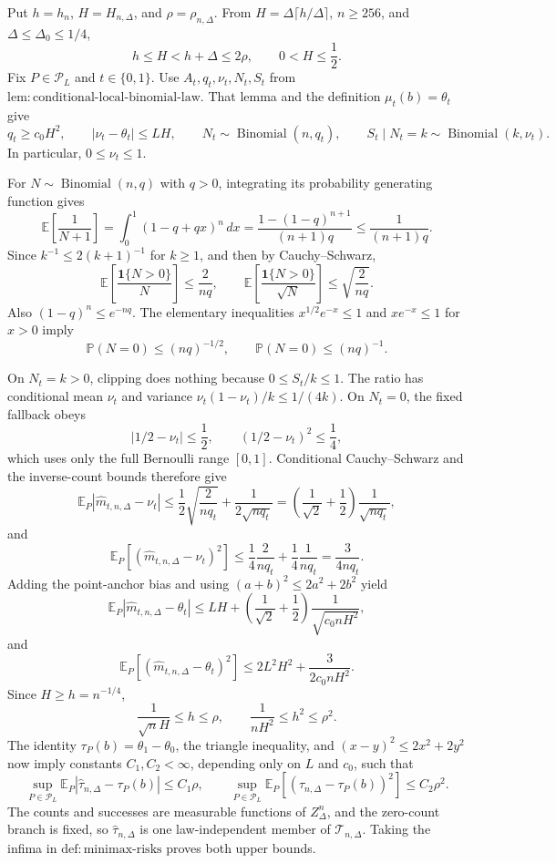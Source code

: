 Put \(h=h_n\), \(H=H_{n,\Delta}\), and \(\rho=\rho_{n,\Delta}\).  From \(H=\Delta\lceil h/\Delta\rceil\), \(n\geq256\), and \(\Delta\leq\Delta_0\leq1/4\),
\[
 h\leq H<h+\Delta\leq2\rho,
 \qquad 0<H\leq\frac12.
\]
Fix \(P\in\mathcal P_L\) and \(t\in\{0,1\}\).  Use \(A_t,q_t,\nu_t,N_t,S_t\) from \(\mathrm{lem:conditional\text{-}local\text{-}binomial\text{-}law}\).  That lemma and the definition \(\mu_t(b)=\theta_t\) give
\[
 q_t\geq c_0H^2,
 \qquad |\nu_t-\theta_t|\leq LH,
 \qquad N_t\sim\operatorname{Binomial}(n,q_t),
 \qquad S_t\mid N_t=k\sim\operatorname{Binomial}(k,\nu_t).
\]
In particular, \(0\leq\nu_t\leq1\).

For \(N\sim\operatorname{Binomial}(n,q)\) with \(q>0\), integrating its probability generating function gives
\[
 \mathbb E\!\left[\frac1{N+1}\right]
 =\int_0^1(1-q+qx)^n\,dx
 =\frac{1-(1-q)^{n+1}}{(n+1)q}
 \leq\frac1{(n+1)q}.
\]
Since \(k^{-1}\leq2(k+1)^{-1}\) for \(k\geq1\), and then by Cauchy--Schwarz,
\[
 \mathbb E\!\left[\frac{\mathbf1\{N>0\}}N\right]\leq\frac2{nq},
 \qquad
 \mathbb E\!\left[\frac{\mathbf1\{N>0\}}{\sqrt N}\right]
 \leq\sqrt{\frac2{nq}}.
\]
Also \((1-q)^n\leq e^{-nq}\).  The elementary inequalities \(x^{1/2}e^{-x}\leq1\) and \(xe^{-x}\leq1\) for \(x>0\) imply
\[
 \mathbb P(N=0)\leq(nq)^{-1/2},
 \qquad
 \mathbb P(N=0)\leq(nq)^{-1}.
\]

On \(N_t=k>0\), clipping does nothing because \(0\leq S_t/k\leq1\).  The ratio has conditional mean \(\nu_t\) and variance \(\nu_t(1-\nu_t)/k\leq1/(4k)\).  On \(N_t=0\), the fixed fallback obeys
\[
 |1/2-\nu_t|\leq\frac12,
 \qquad (1/2-\nu_t)^2\leq\frac14,
\]
which uses only the full Bernoulli range \([0,1]\).  Conditional Cauchy--Schwarz and the inverse-count bounds therefore give
\[
 \mathbb E_P|\widehat m_{t,n,\Delta}-\nu_t|
 \leq\frac12\sqrt{\frac2{nq_t}}
      +\frac1{2\sqrt{nq_t}}
 =\left(\frac1{\sqrt2}+\frac12\right)\frac1{\sqrt{nq_t}},
\]
and
\[
 \mathbb E_P[(\widehat m_{t,n,\Delta}-\nu_t)^2]
 \leq\frac14\frac2{nq_t}+\frac14\frac1{nq_t}
 =\frac3{4nq_t}.
\]
Adding the point-anchor bias and using \((a+b)^2\leq2a^2+2b^2\) yield
\[
 \mathbb E_P|\widehat m_{t,n,\Delta}-\theta_t|
 \leq LH+\left(\frac1{\sqrt2}+\frac12\right)
              \frac1{\sqrt{c_0nH^2}},
\]
and
\[
 \mathbb E_P[(\widehat m_{t,n,\Delta}-\theta_t)^2]
 \leq2L^2H^2+\frac3{2c_0nH^2}.
\]
Since \(H\geq h=n^{-1/4}\),
\[
 \frac1{\sqrt nH}\leq h\leq\rho,
 \qquad
 \frac1{nH^2}\leq h^2\leq\rho^2.
\]
The identity \(\tau_P(b)=\theta_1-\theta_0\), the triangle inequality, and \((x-y)^2\leq2x^2+2y^2\) now imply constants \(C_1,C_2<\infty\), depending only on \(L\) and \(c_0\), such that
\[
 \sup_{P\in\mathcal P_L}
 \mathbb E_P|\widehat\tau_{n,\Delta}-\tau_P(b)|\leq C_1\rho,
 \qquad
 \sup_{P\in\mathcal P_L}
 \mathbb E_P[(\widehat\tau_{n,\Delta}-\tau_P(b))^2]\leq C_2\rho^2.
\]
The counts and successes are measurable functions of \(Z_\Delta^n\), and the zero-count branch is fixed, so \(\widehat\tau_{n,\Delta}\) is one law-independent member of \(\mathcal T_{n,\Delta}\).  Taking the infima in \(\mathrm{def:minimax\text{-}risks}\) proves both upper bounds.

